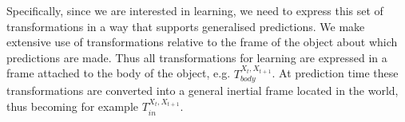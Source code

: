 Specifically, since we are interested in learning, we need to express this set of transformations in a way that supports generalised predictions. We make extensive use of transformations relative to the frame of the object about which predictions are made. Thus all transformations for learning are expressed in a frame attached to the body of the object, e.g. $T_{body}^{X_{t}, X_{t+1}}$. At prediction time these transformations are converted into a general inertial frame located in the world, thus becoming for example $T_{in}^{X_{t},X_{t+1}}$. 
%
